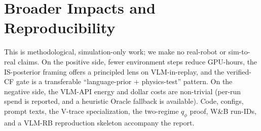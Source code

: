 \section{Broader Impacts and Reproducibility}
\label{app:impact}

This is methodological, simulation-only work; we make no real-robot
or sim-to-real claims. On the positive side, fewer environment steps
reduce GPU-hours, the IS-posterior framing offers a principled lens
on VLM-in-replay, and the verified-CF gate is a transferable
``language-prior + physics-test'' pattern. On the negative side, the
VLM-API energy and dollar costs are non-trivial (per-run spend is
reported, and a heuristic Oracle fallback is available). Code,
configs, prompt texts, the V-trace specialization, the two-regime
$q_\phi$ proof, W\&B run-IDs, and a VLM-RB \citep{sharony2026vlmrb}
reproduction skeleton accompany the report.
